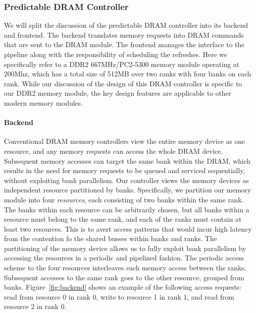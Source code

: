 \subsubsection{Predictable DRAM Controller}
\label{sec:pret_dram_controller}
We will split the discussion of the predictable DRAM controller into its backend and frontend. 
The backend translates memory requests into DRAM commands that are sent to the DRAM module.
The frontend manages the interface to the pipeline along with the responsibility of scheduling the refreshes.
Here we specifically refer to a DDR2 667MHz/PC2-5300 memory module operating at 200Mhz, which has a total size of 512MB over two ranks with four banks on each rank.
While our discussion of the design of this DRAM controller is specific to our DDR2 memory module, the key design features are applicable to other modern memory modules.

\paragraph{Backend}
Conventional DRAM memory controllers view the entire memory device as one resource, and any memory requests can access the whole DRAM device. 
Subsequent memory accesses can target the same bank within the DRAM, which results in the need for memory requests to be queued and serviced sequentially, without exploiting bank parallelism.
Our controller views the memory devices as independent resource partitioned by banks. 
Specifically, we partition our memory module into four \emph{resources}, each consisting of two banks within the same rank. 
The banks within each resource can be arbitrarily chosen, but all banks within a resource must belong to the same rank, and each of the ranks must contain at least two resources.
This is to avert access patterns that would incur high latency from the contention fo the shared busses within banks and ranks.
The partitioning of the memory device allows us to fully exploit bank parallelism by accessing the resources in a periodic and pipelined fashion.
The periodic access scheme to the four resources interleaves each memory access between the ranks.
Subsequent accesses to the same rank goes to the other resource, grouped from banks.  
Figure~\ref{fig:backend} shows an example of the following access requests: read from resource 0 in rank 0, write to resource 1 in rank 1, and read from resource 2 in rank 0. 

